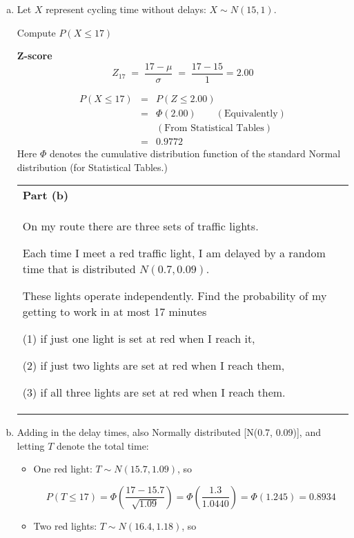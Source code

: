 \documentclass[a4paper,12pt]{article}
\begin{document}
\begin{enumerate}[(a)]
\item 

Let $X$ represent cycling time without delays: $X \sim N(15, 1)$.

Compute $P(X \leq 17)$
\begin{framed}
\noindent \textbf{Z-score}
\[Z_{17} \;=\; \frac{17 - \mu}{\sigma} \;= \;\frac{17-15}{1}= 2.00\]
\end{framed}
\begin{eqnarray*} 
P(X \leq 17)  &=& P(Z \leq 2.00) \\
 &=& \Phi(2.00) \qquad (\mbox{Equivalently})\\
 & & (\mbox{From Statistical Tables}) \\
 &=& 0.9772
\end{eqnarray*} 
\large
Here $\Phi$ denotes the cumulative distribution function of the standard Normal distribution (for Statistical Tables.)

\newpage
\large

\begin{table}[ht!]
 \centering
 \begin{tabular}{|p{15cm}|}
 \hline
\noindent \textbf{Part (b)}\\ \large On my route there are three sets of traffic lights.

Each time I meet a red traffic light, I am delayed by a random time that is distributed $N(0.7, 0.09)$. 

These lights operate independently. Find the probability of my getting to work in at most 17 minutes

(1) if just one light is set at red when I reach it,

(2) if just two lights are set at red when I reach them,

(3) if all three lights are set at red when I reach them.

\\ \hline
  \end{tabular}
\end{table}



\large
\item  Adding in the delay times, also Normally distributed [N(0.7, 0.09)], and letting $T$ denote the total time:
\begin{itemize}
\item One red light: $T \sim N(15.7, 1.09)$, so

\[P(T \leq 17) = \Phi \left( \frac{17 - 15.7}{\sqrt{1.09}} \right) = \Phi \left( \frac{1.3}{ 1.0440} \right)  = \Phi(1.245) = 0.8934\]
\item Two red lights: $T \sim N(16.4, 1.18)$, so




\end{itemize}
\end{enumerate}
\end{document}

